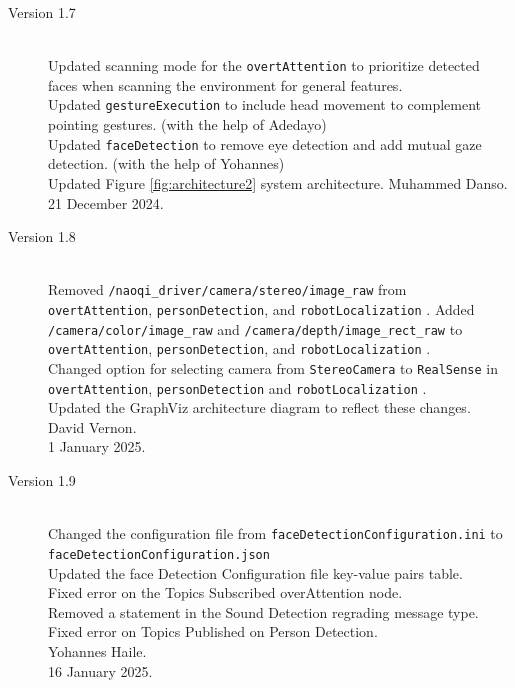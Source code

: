 \documentclass{CSSRforAfrica}
\begin{document}
{\begin{description}
\item [Version 1.7]~\\
Updated scanning mode for the {\small \verb+overtAttention+} to prioritize detected faces when scanning the environment for general features.\\
Updated {\small \verb+gestureExecution+} to include head movement to complement pointing gestures. (with the help of Adedayo)\\
Updated  {\small \verb+faceDetection+} to remove eye detection and add mutual gaze detection. (with the help of Yohannes)\\
Updated Figure \ref{fig:architecture2} system architecture.
Muhammed Danso. \\                          
21 December 2024.

\item [Version 1.8]~\\
Removed {\small \verb+/naoqi_driver/camera/stereo/image_raw+ } from {\small \verb+overtAttention+}, {\small \verb+personDetection+}, and {\small \verb+robotLocalization+} .
Added {\small \verb+/camera/color/image_raw+ } and {\small \verb+/camera/depth/image_rect_raw+ }  to  {\small \verb+overtAttention+}, {\small \verb+personDetection+}, and {\small \verb+robotLocalization+} .\\ 
Changed option for selecting camera from {\small \verb+StereoCamera+}  to {\small \verb+RealSense+} in   {\small \verb+overtAttention+}, {\small \verb+personDetection+} and {\small \verb+robotLocalization+} . \\
Updated the GraphViz architecture diagram to reflect these changes.\\
David Vernon. \\                          
1 January 2025.

\item [Version 1.9]~\\
Changed the configuration file from \texttt{faceDetectionConfiguration.ini} to \\ \texttt{faceDetectionConfiguration.json}\\
Updated the face Detection Configuration file key-value pairs table. \\
Fixed error on the Topics Subscribed overAttention node. \\
Removed a statement in the Sound Detection regrading message type.\\
Fixed error on Topics Published on Person Detection.\\
Yohannes Haile. \\
16 January 2025.


\end{description}}
\end{document}
